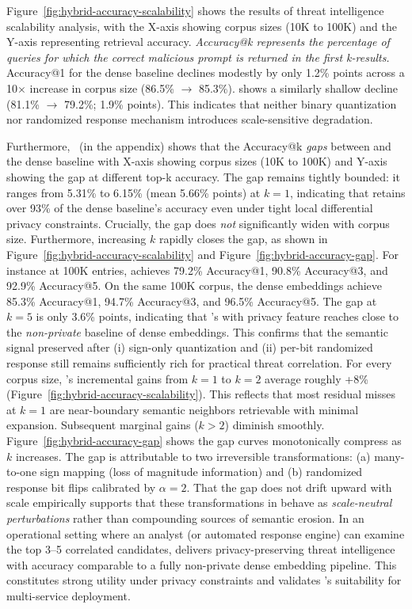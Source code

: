 Figure~\ref{fig:hybrid-accuracy-scalability} shows the results of threat intelligence scalability analysis, with the X-axis showing corpus sizes (10K to 100K) and the Y-axis representing retrieval accuracy.
\emph{Accuracy@k represents the percentage of queries for which the correct malicious prompt is returned in the first k-results.}
Accuracy@1 for the dense baseline declines modestly by only 1.2\% points across a 10$\times$ increase in corpus size (86.5\% $\rightarrow$ 85.3\%).
\tool{} shows a similarly shallow decline (81.1\% $\rightarrow$ 79.2\%; 1.9\% points). This indicates that neither binary quantization nor randomized response mechanism introduces scale-sensitive degradation.

Furthermore,~ (in the appendix) shows that the Accuracy@k \emph{gaps} between \tool and the dense baseline with X-axis showing corpus sizes (10K to 100K) and Y-axis showing the gap at different top-k accuracy.
The gap remains tightly bounded: it ranges from 5.31\% to 6.15\% (mean 5.66\% points) at $k=1$, indicating that \tool retains over 93\% of the dense baseline's accuracy even under tight local differential privacy constraints.
Crucially, the gap does \emph{not} significantly widen with corpus size.
Furthermore, increasing $k$ rapidly closes the gap, as shown in Figure~\ref{fig:hybrid-accuracy-scalability} and Figure~\ref{fig:hybrid-accuracy-gap}.
For instance at 100K entries, \tool achieves 79.2\% Accuracy@1, 90.8\% Accuracy@3, and 92.9\% Accuracy@5. On the same 100K corpus, the dense embeddings achieve 85.3\% Accuracy@1, 94.7\% Accuracy@3, and 96.5\% Accuracy@5.
The gap at $k=5$ is only 3.6\% points, indicating that \tool's with  privacy feature reaches close to the \emph{non-private} baseline of dense embeddings.
This confirms that the semantic signal preserved after (i) sign-only quantization and (ii) per-bit randomized response still remains sufficiently rich for practical threat correlation.
For every corpus size, \tool's incremental gains from $k=1$ to $k=2$ average roughly +8\% (Figure~\ref{fig:hybrid-accuracy-scalability}).
This reflects that most residual misses at $k=1$ are near-boundary semantic neighbors retrievable with minimal expansion. Subsequent marginal gains ($k>2$) diminish smoothly.
Figure~\ref{fig:hybrid-accuracy-gap} shows the gap curves monotonically compress as $k$ increases.
The gap is attributable to two irreversible transformations: (a) many-to-one sign mapping (loss of magnitude information) and (b) randomized response bit flips calibrated by $\alpha=2$.
That the gap does not drift upward with scale empirically supports that these transformations in \tool behave as \emph{scale-neutral perturbations} rather than compounding sources of semantic erosion.
In an operational setting where an analyst (or automated response engine) can examine the top 3--5 correlated candidates, \tool delivers privacy-preserving threat intelligence with accuracy comparable to a fully non-private dense embedding pipeline.
This constitutes strong utility under privacy constraints and validates \tool's suitability for multi-service deployment.

